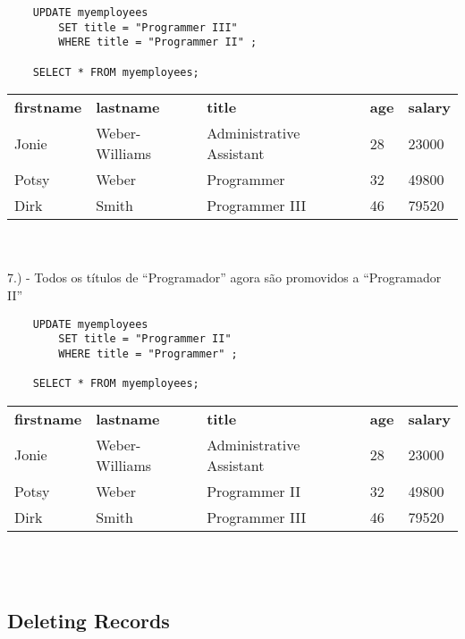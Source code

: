 \begin{lstlisting}
    UPDATE myemployees 
	    SET title = "Programmer III" 
	    WHERE title = "Programmer II" ;

    SELECT * FROM myemployees;
\end{lstlisting}

\begin{tabular}{l l l l l}
    {\textbf{firstname}} & {\textbf{lastname}} & {\textbf{title}} & {\textbf{age}} & {\textbf{salary}} \\
    {Jonie}              & {Weber-Williams}    & {Administrative Assistant}      & {28}           & {23000}           \\
    {Potsy}              & {Weber}             & {Programmer}     & {32}           & {49800}           \\
    {Dirk}               & {Smith}             & {Programmer III}  & {46}           & {79520}          
\end{tabular} \\ \\

7.) - Todos os títulos de “Programador” agora são promovidos a “Programador II”

\begin{lstlisting}
    UPDATE myemployees 
	    SET title = "Programmer II" 
	    WHERE title = "Programmer" ;

    SELECT * FROM myemployees;
\end{lstlisting}

\begin{tabular}{l l l l l}
    {\textbf{firstname}} & {\textbf{lastname}} & {\textbf{title}} & {\textbf{age}} & {\textbf{salary}} \\
    {Jonie}              & {Weber-Williams}    & {Administrative Assistant}      & {28}           & {23000}           \\
    {Potsy}              & {Weber}             & {Programmer II}     & {32}           & {49800}           \\
    {Dirk}               & {Smith}             & {Programmer III}  & {46}           & {79520}          
\end{tabular} \\ \\


\subsection{Deleting Records}

